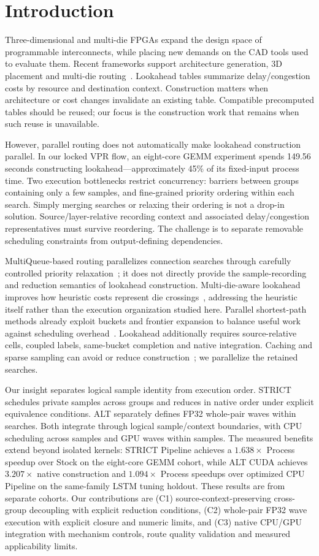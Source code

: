 \section{Introduction}
Three-dimensional and multi-die FPGAs expand the design space of programmable interconnects, while placing new demands on the CAD tools used to evaluate them. Recent frameworks support architecture generation, 3D placement and multi-die routing~\cite{lazagna,flatland,multidie}. Lookahead tables summarize delay/congestion costs by resource and destination context. Construction matters when architecture or cost changes invalidate an existing table. Compatible precomputed tables should be reused; our focus is the construction work that remains when such reuse is unavailable.

However, parallel routing does not automatically make lookahead construction parallel. In our locked VPR flow, an eight-core GEMM experiment spends 149.56 seconds constructing lookahead---approximately 45\% of its fixed-input process time. Two execution bottlenecks restrict concurrency: barriers between groups containing only a few samples, and fine-grained priority ordering within each search. Simply merging searches or relaxing their ordering is not a drop-in solution. Source/layer-relative recording context and associated delay/congestion representatives must survive reordering. The challenge is to separate removable scheduling constraints from output-defining dependencies.

MultiQueue-based routing parallelizes connection searches through carefully controlled priority relaxation~\cite{multiqueue}; it does not directly provide the sample-recording and reduction semantics of lookahead construction. Multi-die-aware lookahead improves how heuristic costs represent die crossings~\cite{multidie}, addressing the heuristic itself rather than the execution organization studied here. Parallel shortest-path methods already exploit buckets and frontier expansion to balance useful work against scheduling overhead~\cite{delta,gpu_sssp}. Lookahead additionally requires source-relative cells, coupled labels, same-bucket completion and native integration. Caching and sparse sampling can avoid or reduce construction~\cite{vproptions}; we parallelize the retained searches.

Our insight separates logical sample identity from execution order. STRICT schedules private samples across groups and reduces in native order under explicit equivalence conditions. ALT separately defines FP32 whole-pair waves within searches. Both integrate through logical sample/context boundaries, with CPU scheduling across samples and GPU waves within samples. The measured benefits extend beyond isolated kernels: STRICT Pipeline achieves a $1.638\times$ Process speedup over Stock on the eight-core GEMM cohort, while ALT CUDA achieves $3.207\times$ native construction and $1.094\times$ Process speedups over optimized CPU Pipeline on the same-family LSTM tuning holdout. These results are from separate cohorts. Our contributions are (C1) source-context-preserving cross-group decoupling with explicit reduction conditions, (C2) whole-pair FP32 wave execution with explicit closure and numeric limits, and (C3) native CPU/GPU integration with mechanism controls, route quality validation and measured applicability limits.
